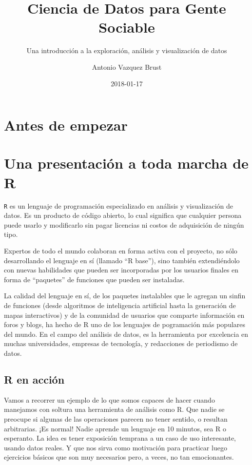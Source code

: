 \documentclass[]{book}
\title{Ciencia de Datos para Gente Sociable}
\subtitle{Una introducción a la exploración, análisis y visualización de datos}
\author{Antonio Vazquez Brust}
\date{2018-01-17}
\theoremstyle{definition}
\theoremstyle{definition}
\theoremstyle{definition}
\theoremstyle{remark}
\begin{document}
\maketitle

{
\setcounter{tocdepth}{1}
\tableofcontents
}
\chapter*{Antes de empezar}\label{antes-de-empezar}

\chapter{Una presentación a toda marcha de
R}\label{una-presentacion-a-toda-marcha-de-r}

\texttt{R} es un lenguaje de programación especializado en análisis y
visualización de datos. Es un producto de código abierto, lo cual
significa que cualquier persona puede usarlo y modificarlo sin pagar
licencias ni costos de adquisición de ningún tipo.

Expertos de todo el mundo colaboran en forma activa con el proyecto, no
sólo desarrollando el lenguaje en sí (llamado ``R base''), sino también
extendiéndolo con nuevas habilidades que pueden ser incorporadas por los
usuarios finales en forma de ``paquetes'' de funciones que pueden ser
instaladas.

La calidad del lenguaje en sí, de los paquetes instalables que le
agregan un sinfin de funciones (desde algoritmos de inteligencia
artificial hasta la generación de mapas interactivos) y de la comunidad
de usuarios que comparte información en foros y blogs, ha hecho de R uno
de los lenguajes de pogramación más populares del mundo. En el campo del
análisis de datos, es la herramienta por excelencia en muchas
universidades, empresas de tecnología, y redacciones de periodismo de
datos.

\section{R en acción}\label{r-en-accion}

Vamos a recorrer un ejemplo de lo que somos capaces de hacer cuando
manejamos con soltura una herramienta de análisis como R. Que nadie se
preocupe si algunas de las operaciones parecen no tener sentido, o
resultan arbitrarias. ¡Es normal! Nadie aprende un lenguaje en 10
minutos, sea R o esperanto. La idea es tener exposición temprana a un
caso de uso interesante, usando datos reales. Y que nos sirva como
motivación para practicar luego ejercicios básicos que son muy
necesarios pero, a veces, no tan emocionantes.
\end{document}
